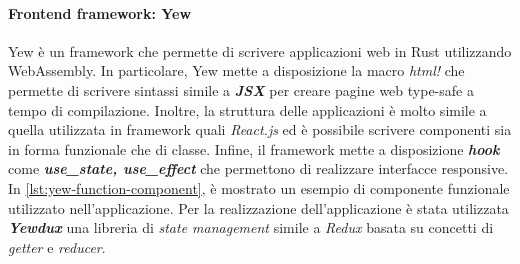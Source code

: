 \documentclass{article}
\begin{document}
\paragraph{Frontend framework: Yew} Yew è un framework che permette di scrivere applicazioni 
web in Rust utilizzando WebAssembly. In particolare, Yew mette a disposizione la macro 
\textit{html!} che permette di scrivere sintassi simile a \textbf{\textit{JSX}} per creare 
pagine web type-safe a tempo di compilazione. Inoltre, la struttura delle applicazioni è molto 
simile a quella utilizzata in framework quali \textit{React.js} ed è possibile scrivere 
componenti sia in forma funzionale che di classe. Infine, il framework mette a disposizione
\textbf{\textit{hook}} come \textbf{\textit{use\_state, use\_effect}} che permettono di 
realizzare interfacce responsive. In \cref{lst:yew-function-component}, è mostrato un esempio di componente funzionale utilizzato 
nell'applicazione. Per la realizzazione dell'applicazione è stata utilizzata \textbf{\textit{Yewdux}}
una libreria di \textit{state management} simile a \textit{Redux} basata su concetti di 
\textit{getter} e \textit{reducer}.
\end{document}
